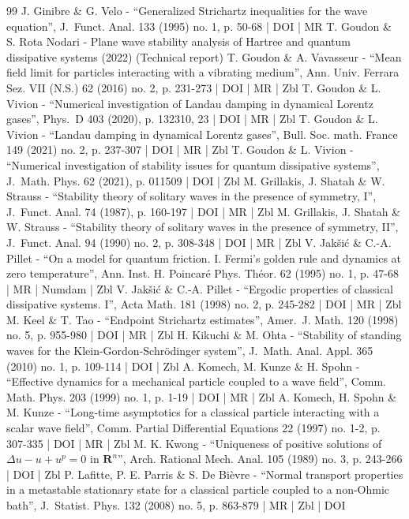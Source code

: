 \documentclass[10pt]{amsart}
\theoremstyle{definition}
\begin{document}
\begin{thebibliography}{99}
J. Ginibre \& G. Velo - “Generalized Strichartz inequalities for the wave equation”, J. Funct. Anal. 133 (1995) no. 1, p. 50-68 | DOI | MR
T. Goudon \& S. Rota Nodari - Plane wave stability analysis of Hartree and quantum dissipative systems (2022) (Technical report)
T. Goudon \& A. Vavasseur - “Mean field limit for particles interacting with a vibrating medium”, Ann. Univ. Ferrara Sez. VII (N.S.) 62 (2016) no. 2, p. 231-273 | DOI | MR | Zbl
T. Goudon \& L. Vivion - “Numerical investigation of Landau damping in dynamical Lorentz gases”, Phys. D 403 (2020), p. 132310, 23 | DOI | MR | Zbl
T. Goudon \& L. Vivion - “Landau damping in dynamical Lorentz gases”, Bull. Soc. math. France 149 (2021) no. 2, p. 237-307 | DOI | MR | Zbl
T. Goudon \& L. Vivion - “Numerical investigation of stability issues for quantum dissipative systems”, J. Math. Phys. 62 (2021), p. 011509 | DOI | Zbl
M. Grillakis, J. Shatah \& W. Strauss - “Stability theory of solitary waves in the presence of symmetry, I”, J. Funct. Anal. 74 (1987), p. 160-197 | DOI | MR | Zbl
M. Grillakis, J. Shatah \& W. Strauss - “Stability theory of solitary waves in the presence of symmetry, II”, J. Funct. Anal. 94 (1990) no. 2, p. 308-348 | DOI | MR | Zbl
V. Jakšić \& C.-A. Pillet - “On a model for quantum friction. I. Fermi’s golden rule and dynamics at zero temperature”, Ann. Inst. H. Poincaré Phys. Théor. 62 (1995) no. 1, p. 47-68 | MR | Numdam | Zbl
V. Jakšić \& C.-A. Pillet - “Ergodic properties of classical dissipative systems. I”, Acta Math. 181 (1998) no. 2, p. 245-282 | DOI | MR | Zbl
M. Keel \& T. Tao - “Endpoint Strichartz estimates”, Amer. J. Math. 120 (1998) no. 5, p. 955-980 | DOI | MR | Zbl
H. Kikuchi \& M. Ohta - “Stability of standing waves for the Klein-Gordon-Schrödinger system”, J. Math. Anal. Appl. 365 (2010) no. 1, p. 109-114 | DOI | Zbl
A. Komech, M. Kunze \& H. Spohn - “Effective dynamics for a mechanical particle coupled to a wave field”, Comm. Math. Phys. 203 (1999) no. 1, p. 1-19 | DOI | MR | Zbl
A. Komech, H. Spohn \& M. Kunze - “Long-time asymptotics for a classical particle interacting with a scalar wave field”, Comm. Partial Differential Equations 22 (1997) no. 1-2, p. 307-335 | DOI | MR | Zbl
M. K. Kwong - “Uniqueness of positive solutions of $\Delta u-u+u^p=0$ in ${\mathbf{R}}^n$”, Arch. Rational Mech. Anal. 105 (1989) no. 3, p. 243-266 | DOI | Zbl
P. Lafitte, P. E. Parris \& S. De Bièvre - “Normal transport properties in a metastable stationary state for a classical particle coupled to a non-Ohmic bath”, J. Statist. Phys. 132 (2008) no. 5, p. 863-879 | MR | Zbl | DOI

\end{thebibliography}
\end{document}
